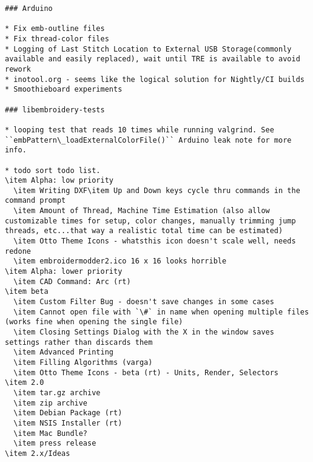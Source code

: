 \begin{verbatim}
### Arduino

* Fix emb-outline files
* Fix thread-color files
* Logging of Last Stitch Location to External USB Storage(commonly available and easily replaced), wait until TRE is available to avoid rework
* inotool.org - seems like the logical solution for Nightly/CI builds
* Smoothieboard experiments

### libembroidery-tests

* looping test that reads 10 times while running valgrind. See ``embPattern\_loadExternalColorFile()`` Arduino leak note for more info.

* todo sort todo list.
\item Alpha: low priority
  \item Writing DXF\item Up and Down keys cycle thru commands in the command prompt
  \item Amount of Thread, Machine Time Estimation (also allow customizable times for setup, color changes, manually trimming jump threads, etc...that way a realistic total time can be estimated)
  \item Otto Theme Icons - whatsthis icon doesn't scale well, needs redone
  \item embroidermodder2.ico 16 x 16 looks horrible
\item Alpha: lower priority
  \item CAD Command: Arc (rt)
\item beta
  \item Custom Filter Bug - doesn't save changes in some cases
  \item Cannot open file with `\#` in name when opening multiple files (works fine when opening the single file)
  \item Closing Settings Dialog with the X in the window saves settings rather than discards them
  \item Advanced Printing
  \item Filling Algorithms (varga)
  \item Otto Theme Icons - beta (rt) - Units, Render, Selectors
\item 2.0
  \item tar.gz archive
  \item zip archive
  \item Debian Package (rt)
  \item NSIS Installer (rt)
  \item Mac Bundle?
  \item press release
\item 2.x/Ideas

\end{verbatim}
